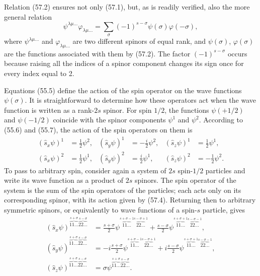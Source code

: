 Relation (57.2) ensures not only (57.1), but, as is readily verified, also the
more general relation
\begin{equation}
 \psi^{\lambda\mu\ldots}\varphi_{\lambda\mu\ldots}
 =\sum_\sigma(-1)^{s-\sigma}\psi(\sigma)\varphi(-\sigma),
 \tag{57.3}
\end{equation}
where $\psi^{\lambda\mu\ldots}$ and $\varphi_{\lambda\mu\ldots}$ are two
different spinors of equal rank, and $\psi(\sigma)$, $\varphi(\sigma)$ are
the functions associated with them by (57.2). The factor
$(-1)^{s-\sigma}$ occurs because raising all the indices of a spinor component
changes its sign once for every index equal to 2.

Equations (55.5) define the action of the spin operator on the wave functions
$\psi(\sigma)$. It is straightforward to determine how these operators act
when the wave function is written as a rank-$2s$ spinor. For spin $1/2$, the
functions $\psi(+1/2)$ and $\psi(-1/2)$ coincide with the spinor components
$\psi^1$ and $\psi^2$. According to (55.6) and (55.7), the action of the spin
operators on them is
\begin{equation}
 \begin{aligned}
 (\hat s_x\psi)^1&=\tfrac12\psi^2,&
 (\hat s_y\psi)^1&=-\tfrac i2\psi^2,&
 (\hat s_z\psi)^1&=\tfrac12\psi^1,\\
 (\hat s_x\psi)^2&=\tfrac12\psi^1,&
 (\hat s_y\psi)^2&=\tfrac i2\psi^1,&
 (\hat s_z\psi)^2&=-\tfrac12\psi^2.
 \end{aligned}
 \tag{57.4}
\end{equation}
To pass to arbitrary spin, consider again a system of $2s$ spin-$1/2$
particles and write its wave function as a product of $2s$ spinors. The spin
operator of the system is the sum of the spin operators of the particles;
each acts only on its corresponding spinor, with its action given by (57.4).
Returning then to arbitrary symmetric spinors, or equivalently to wave
functions of a spin-$s$ particle, gives
\begin{equation}
 \begin{aligned}
 (\hat s_x\psi)^{\overbrace{11\ldots}^{s+\sigma}
                         \overbrace{22\ldots}^{s-\sigma}}
 &=\frac{s+\sigma}{2}\psi^{\overbrace{11\ldots}^{s+\sigma-1}
                                  \overbrace{22\ldots}^{s-\sigma+1}}
 +\frac{s-\sigma}{2}\psi^{\overbrace{11\ldots}^{s+\sigma+1}
                                  \overbrace{22\ldots}^{s-\sigma-1}},\\
 (\hat s_y\psi)^{\overbrace{11\ldots}^{s+\sigma}
                         \overbrace{22\ldots}^{s-\sigma}}
 &=-i\frac{s+\sigma}{2}\psi^{\overbrace{11\ldots}^{s+\sigma-1}
                                   \overbrace{22\ldots}^{s-\sigma+1}}
 +i\frac{s-\sigma}{2}\psi^{\overbrace{11\ldots}^{s+\sigma+1}
                                  \overbrace{22\ldots}^{s-\sigma-1}},\\
 (\hat s_z\psi)^{\overbrace{11\ldots}^{s+\sigma}
                         \overbrace{22\ldots}^{s-\sigma}}
 &=\sigma\psi^{\overbrace{11\ldots}^{s+\sigma}
                       \overbrace{22\ldots}^{s-\sigma}}.
 \end{aligned}
 \tag{57.5}
\end{equation}
